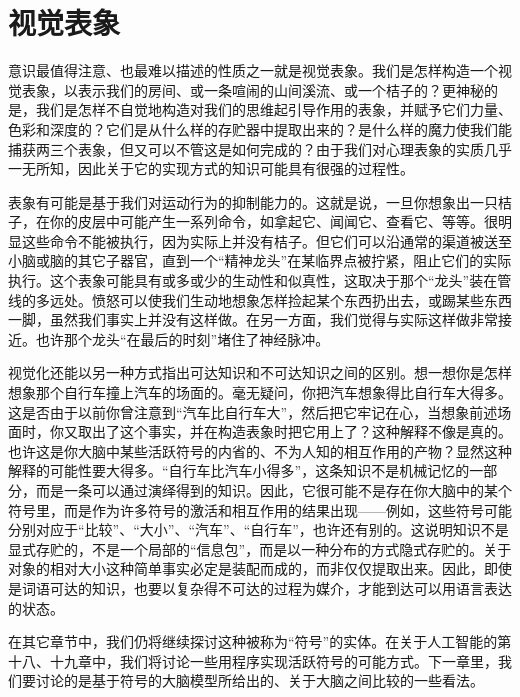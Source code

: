 \section{视觉表象}

意识最值得注意、也最难以描述的性质之一就是视觉表象。我们是怎样构造一个视觉表象，以表示我们的房间、或一条喧闹的山间溪流、或一个桔子的？更神秘的是，我们是怎样不自觉地构造对我们的思维起引导作用的表象，并赋予它们力量、色彩和深度的？它们是从什么样的存贮器中提取出来的？是什么样的魔力使我们能捕获两三个表象，但又可以不管这是如何完成的？由于我们对心理表象的实质几乎一无所知，因此关于它的实现方式的知识可能具有很强的过程性。

表象有可能是基于我们对运动行为的抑制能力的。这就是说，一旦你想象出一只桔子，在你的皮层中可能产生一系列命令，如拿起它、闻闻它、查看它、等等。很明显这些命令不能被执行，因为实际上并没有桔子。但它们可以沿通常的渠道被送至小脑或脑的其它子器官，直到一个“精神龙头”在某临界点被拧紧，阻止它们的实际执行。这个表象可能具有或多或少的生动性和似真性，这取决于那个“龙头”装在管线的多远处。愤怒可以使我们生动地想象怎样捡起某个东西扔出去，或踢某些东西一脚，虽然我们事实上并没有这样做。在另一方面，我们觉得与实际这样做非常接近。也许那个龙头“在最后的时刻”堵住了神经脉冲。

视觉化还能以另一种方式指出可达知识和不可达知识之间的区别。想一想你是怎样想象那个自行车撞上汽车的场面的。毫无疑问，你把汽车想象得比自行车大得多。这是否由于以前你曾注意到“汽车比自行车大”，然后把它牢记在心，当想象前述场面时，你又取出了这个事实，并在构造表象时把它用上了？这种解释不像是真的。也许这是你大脑中某些活跃符号的内省的、不为人知的相互作用的产物？显然这种解释的可能性要大得多。“自行车比汽车小得多”，这条知识不是机械记忆的一部分，而是一条可以通过演绎得到的知识。因此，它很可能不是存在你大脑中的某个符号里，而是作为许多符号的激活和相互作用的结果出现——例如，这些符号可能分别对应于“比较”、“大小”、“汽车”、“自行车”，也许还有别的。这说明知识不是显式存贮的，不是一个局部的“信息包”，而是以一种分布的方式隐式存贮的。关于对象的相对大小这种简单事实必定是装配而成的，而非仅仅提取出来。因此，即使是词语可达的知识，也要以复杂得不可达的过程为媒介，才能到达可以用语言表达的状态。

在其它章节中，我们仍将继续探讨这种被称为“符号”的实体。在关于人工智能的第十八、十九章中，我们将讨论一些用程序实现活跃符号的可能方式。下一章里，我们要讨论的是基于符号的大脑模型所给出的、关于大脑之间比较的一些看法。
